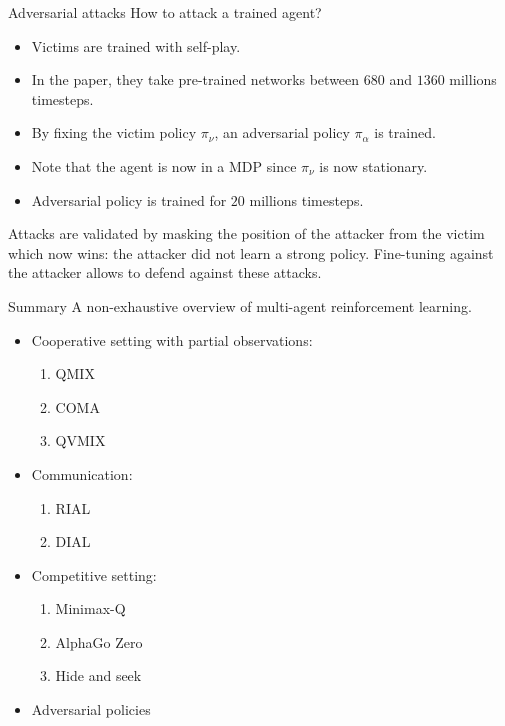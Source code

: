\documentclass[9pt, hyperref={pdfusetitle,colorlinks=true,allcolors=DarkBlue}]{beamer}
\begin{document}
\begin{frame}{Adversarial attacks}
How to attack a trained agent?
\begin{itemize}
    \item Victims are trained with self-play.
    \item In the paper, they take pre-trained networks between $680$ and $1360$ millions timesteps.
    \item By fixing the victim policy $\pi_\nu$, an adversarial policy $\pi_\alpha$ is trained.
    \item Note that the agent is now in a MDP since $\pi_\nu$ is now stationary.
    \item Adversarial policy is trained for $20$ millions timesteps.
\end{itemize}
\vfill
Attacks are validated by masking the position of the attacker from the victim which now wins: the attacker did not learn a strong policy.
\vfill
Fine-tuning against the attacker allows to defend against these attacks.
\end{frame}

\begin{frame}{Summary}
A non-exhaustive overview of multi-agent reinforcement learning.
\begin{itemize}
    \item Cooperative setting with partial observations:
    \begin{enumerate}
        \item QMIX
        \item COMA
        \item QVMIX
    \end{enumerate}
    \item Communication:
    \begin{enumerate}
        \item RIAL
        \item DIAL
    \end{enumerate}
    \item Competitive setting:
    \begin{enumerate}
        \item Minimax-Q
        \item AlphaGo Zero
        \item Hide and seek
    \end{enumerate}
    \item Adversarial policies
\end{itemize}
\end{frame}
\end{document}
